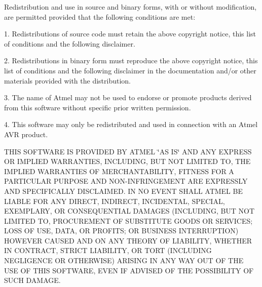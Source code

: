 \-Redistribution and use in source and binary forms, with or without modification, are permitted provided that the following conditions are met\-:

1. \-Redistributions of source code must retain the above copyright notice, this list of conditions and the following disclaimer.

2. \-Redistributions in binary form must reproduce the above copyright notice, this list of conditions and the following disclaimer in the documentation and/or other materials provided with the distribution.

3. \-The name of \-Atmel may not be used to endorse or promote products derived from this software without specific prior written permission.

4. \-This software may only be redistributed and used in connection with an \-Atmel \-A\-V\-R product.

\-T\-H\-I\-S \-S\-O\-F\-T\-W\-A\-R\-E \-I\-S \-P\-R\-O\-V\-I\-D\-E\-D \-B\-Y \-A\-T\-M\-E\-L \char`\"{}\-A\-S I\-S\char`\"{} \-A\-N\-D \-A\-N\-Y \-E\-X\-P\-R\-E\-S\-S \-O\-R \-I\-M\-P\-L\-I\-E\-D \-W\-A\-R\-R\-A\-N\-T\-I\-E\-S, \-I\-N\-C\-L\-U\-D\-I\-N\-G, \-B\-U\-T \-N\-O\-T \-L\-I\-M\-I\-T\-E\-D \-T\-O, \-T\-H\-E \-I\-M\-P\-L\-I\-E\-D \-W\-A\-R\-R\-A\-N\-T\-I\-E\-S \-O\-F \-M\-E\-R\-C\-H\-A\-N\-T\-A\-B\-I\-L\-I\-T\-Y, \-F\-I\-T\-N\-E\-S\-S \-F\-O\-R \-A \-P\-A\-R\-T\-I\-C\-U\-L\-A\-R \-P\-U\-R\-P\-O\-S\-E \-A\-N\-D \-N\-O\-N-\/\-I\-N\-F\-R\-I\-N\-G\-E\-M\-E\-N\-T \-A\-R\-E \-E\-X\-P\-R\-E\-S\-S\-L\-Y \-A\-N\-D \-S\-P\-E\-C\-I\-F\-I\-C\-A\-L\-L\-Y \-D\-I\-S\-C\-L\-A\-I\-M\-E\-D. \-I\-N \-N\-O \-E\-V\-E\-N\-T \-S\-H\-A\-L\-L \-A\-T\-M\-E\-L \-B\-E \-L\-I\-A\-B\-L\-E \-F\-O\-R \-A\-N\-Y \-D\-I\-R\-E\-C\-T, \-I\-N\-D\-I\-R\-E\-C\-T, \-I\-N\-C\-I\-D\-E\-N\-T\-A\-L, \-S\-P\-E\-C\-I\-A\-L, \-E\-X\-E\-M\-P\-L\-A\-R\-Y, \-O\-R \-C\-O\-N\-S\-E\-Q\-U\-E\-N\-T\-I\-A\-L \-D\-A\-M\-A\-G\-E\-S (\-I\-N\-C\-L\-U\-D\-I\-N\-G, \-B\-U\-T \-N\-O\-T \-L\-I\-M\-I\-T\-E\-D \-T\-O, \-P\-R\-O\-C\-U\-R\-E\-M\-E\-N\-T \-O\-F \-S\-U\-B\-S\-T\-I\-T\-U\-T\-E \-G\-O\-O\-D\-S \-O\-R \-S\-E\-R\-V\-I\-C\-E\-S; \-L\-O\-S\-S \-O\-F \-U\-S\-E, \-D\-A\-T\-A, \-O\-R \-P\-R\-O\-F\-I\-T\-S; \-O\-R \-B\-U\-S\-I\-N\-E\-S\-S \-I\-N\-T\-E\-R\-R\-U\-P\-T\-I\-O\-N) \-H\-O\-W\-E\-V\-E\-R \-C\-A\-U\-S\-E\-D \-A\-N\-D \-O\-N \-A\-N\-Y \-T\-H\-E\-O\-R\-Y \-O\-F \-L\-I\-A\-B\-I\-L\-I\-T\-Y, \-W\-H\-E\-T\-H\-E\-R \-I\-N \-C\-O\-N\-T\-R\-A\-C\-T, \-S\-T\-R\-I\-C\-T \-L\-I\-A\-B\-I\-L\-I\-T\-Y, \-O\-R \-T\-O\-R\-T (\-I\-N\-C\-L\-U\-D\-I\-N\-G \-N\-E\-G\-L\-I\-G\-E\-N\-C\-E \-O\-R \-O\-T\-H\-E\-R\-W\-I\-S\-E) \-A\-R\-I\-S\-I\-N\-G \-I\-N \-A\-N\-Y \-W\-A\-Y \-O\-U\-T \-O\-F \-T\-H\-E \-U\-S\-E \-O\-F \-T\-H\-I\-S \-S\-O\-F\-T\-W\-A\-R\-E, \-E\-V\-E\-N \-I\-F \-A\-D\-V\-I\-S\-E\-D \-O\-F \-T\-H\-E \-P\-O\-S\-S\-I\-B\-I\-L\-I\-T\-Y \-O\-F \-S\-U\-C\-H \-D\-A\-M\-A\-G\-E. 